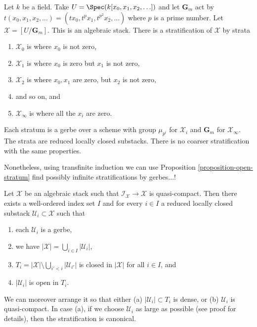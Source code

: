 \begin{example}
\label{example-infinite-stratification}
Let $k$ be a field.
Take $U = \Spec(k[x_0, x_1, x_2, \ldots])$
and let $\mathbf{G}_m$ act by
$t(x_0, x_1, x_2, \ldots) = (tx_0, t^p x_1, t^{p^2} x_2, \ldots)$
where $p$ is a prime number. Let $\mathcal{X} = [U/\mathbf{G}_m]$.
This is an algebraic stack. There is a stratification of $\mathcal{X}$
by strata
\begin{enumerate}
\item $\mathcal{X}_0$ is where $x_0$ is not zero,
\item $\mathcal{X}_1$ is where $x_0$ is zero but $x_1$ is not zero,
\item $\mathcal{X}_2$ is where $x_0, x_1$ are zero, but $x_2$ is not zero,
\item and so on, and
\item $\mathcal{X}_{\infty}$ is where all the $x_i$ are zero.
\end{enumerate}
Each stratum is a gerbe over a scheme with group $\mu_{p^i}$ for
$\mathcal{X}_i$ and $\mathbf{G}_m$ for $\mathcal{X}_{\infty}$.
The strata are reduced locally closed substacks. There is no coarser
stratification with the same properties.
\end{example}

\noindent
Nonetheless, using transfinite induction we can use
Proposition \ref{proposition-open-stratum}
find possibly infinite stratifications by gerbes...!

\begin{lemma}
\label{lemma-every-point-in-a-stratum}
Let $\mathcal{X}$ be an algebraic stack such that
$\mathcal{I}_\mathcal{X} \to \mathcal{X}$ is quasi-compact.
Then there exists a well-ordered index set $I$ and for every $i \in I$
a reduced locally closed substack $\mathcal{U}_i \subset \mathcal{X}$ such that
\begin{enumerate}
\item each $\mathcal{U}_i$ is a gerbe,
\item we have $|\mathcal{X}| = \bigcup_{i \in I} |\mathcal{U}_i|$,
\item $T_i = |\mathcal{X}| \setminus \bigcup_{i' < i} |\mathcal{U}_{i'}|$
is closed in $|\mathcal{X}|$ for all $i \in I$, and
\item $|\mathcal{U}_i|$ is open in $T_i$.
\end{enumerate}
We can moreover arrange it so that either (a) $|\mathcal{U}_i| \subset T_i$
is dense, or (b) $\mathcal{U}_i$ is quasi-compact. In case (a), if
we choose $\mathcal{U}_i$ as large as possible (see proof for details), then
the stratification is canonical.
\end{lemma}

